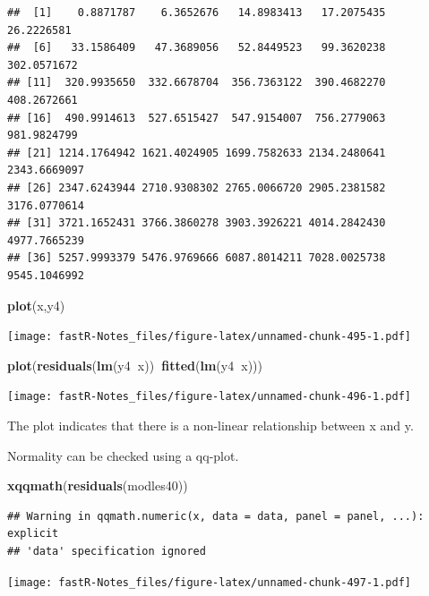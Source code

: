 \documentclass[]{book}
\newenvironment{Shaded}{\begin{snugshade}}{\end{snugshade}}
\newcommand{\KeywordTok}[1]{\textcolor[rgb]{0.13,0.29,0.53}{\textbf{#1}}}
\newcommand{\OperatorTok}[1]{\textcolor[rgb]{0.81,0.36,0.00}{\textbf{#1}}}
\newcommand{\NormalTok}[1]{#1}
\theoremstyle{definition}
\theoremstyle{definition}
\theoremstyle{definition}
\theoremstyle{remark}
\begin{document}
\begin{verbatim}
##  [1]    0.8871787    6.3652676   14.8983413   17.2075435   26.2226581
##  [6]   33.1586409   47.3689056   52.8449523   99.3620238  302.0571672
## [11]  320.9935650  332.6678704  356.7363122  390.4682270  408.2672661
## [16]  490.9914613  527.6515427  547.9154007  756.2779063  981.9824799
## [21] 1214.1764942 1621.4024905 1699.7582633 2134.2480641 2343.6669097
## [26] 2347.6243944 2710.9308302 2765.0066720 2905.2381582 3176.0770614
## [31] 3721.1652431 3766.3860278 3903.3926221 4014.2842430 4977.7665239
## [36] 5257.9993379 5476.9769666 6087.8014211 7028.0025738 9545.1046992
\end{verbatim}

\begin{Shaded}
\begin{Highlighting}[]
\KeywordTok{plot}\NormalTok{(x,y4)}
\end{Highlighting}
\end{Shaded}

\texttt{[image: fastR-Notes\_files/figure-latex/unnamed-chunk-495-1.pdf]}

\begin{Shaded}
\begin{Highlighting}[]
\KeywordTok{plot}\NormalTok{(}\KeywordTok{residuals}\NormalTok{(}\KeywordTok{lm}\NormalTok{(y4}\OperatorTok{~}\NormalTok{x))}\OperatorTok{~}\KeywordTok{fitted}\NormalTok{(}\KeywordTok{lm}\NormalTok{(y4}\OperatorTok{~}\NormalTok{x)))}
\end{Highlighting}
\end{Shaded}

\texttt{[image: fastR-Notes\_files/figure-latex/unnamed-chunk-496-1.pdf]}

The plot indicates that there is a non-linear relationship between x and
y.

Normality can be checked using a qq-plot.

\begin{Shaded}
\begin{Highlighting}[]
\KeywordTok{xqqmath}\NormalTok{(}\KeywordTok{residuals}\NormalTok{(modles40))}
\end{Highlighting}
\end{Shaded}

\begin{verbatim}
## Warning in qqmath.numeric(x, data = data, panel = panel, ...): explicit
## 'data' specification ignored
\end{verbatim}

\texttt{[image: fastR-Notes\_files/figure-latex/unnamed-chunk-497-1.pdf]}
\end{document}
